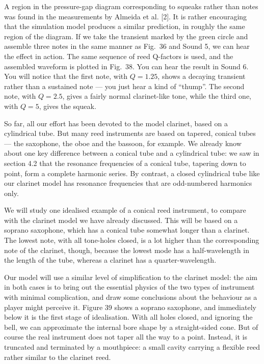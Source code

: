   A region in the pressure-gap diagram corresponding to squeaks rather than 
  notes was found in the measurements by Almeida et al. [2]. It is rather 
  encouraging that the simulation model produces a similar prediction, in 
  roughly the same region of the diagram. If we take the transient marked by 
  the green circle and assemble three notes in the same manner as Fig.\ 36 and 
  Sound 5, we can hear the effect in action. The same sequence of reed 
  Q-factors is used, and the assembled waveform is plotted in Fig.\ 38. You can 
  hear the result in Sound 6. You will notice that the first note, with 
  $Q=1.25$, shows a decaying transient rather than a sustained note --- you 
  just hear a kind of ``thump''. The second note, with $Q=2.5$, gives a fairly 
  normal clarinet-like tone, while the third one, with $Q=5$, gives the squeak. 


  So far, all our effort has been devoted to the model clarinet, based on a 
  cylindrical tube. But many reed instruments are based on tapered, conical 
  tubes — the saxophone, the oboe and the bassoon, for example. We already know 
  about one key difference between a conical tube and a cylindrical tube: we 
  saw in section 4.2 that the resonance frequencies of a conical tube, tapering 
  down to point, form a complete harmonic series. By contrast, a closed 
  cylindrical tube like our clarinet model has resonance frequencies that are 
  odd-numbered harmonics only. 

  We will study one idealised example of a conical reed instrument, to compare 
  with the clarinet model we have already discussed. This will be based on a 
  soprano saxophone, which has a conical tube somewhat longer than a clarinet. 
  The lowest note, with all tone-holes closed, is a lot higher than the 
  corresponding note of the clarinet, though, because the lowest mode has a 
  half-wavelength in the length of the tube, whereas a clarinet has a 
  quarter-wavelength. 

  Our model will use a similar level of simplification to the clarinet model: 
  the aim in both cases is to bring out the essential physics of the two types 
  of instrument with minimal complication, and draw some conclusions about the 
  behaviour as a player might perceive it. Figure 39 shows a soprano saxophone, 
  and immediately below it is the first stage of idealisation. With all holes 
  closed, and ignoring the bell, we can approximate the internal bore shape by 
  a straight-sided cone. But of course the real instrument does not taper all 
  the way to a point. Instead, it is truncated and terminated by a mouthpiece: 
  a small cavity carrying a flexible reed rather similar to the clarinet reed. 

